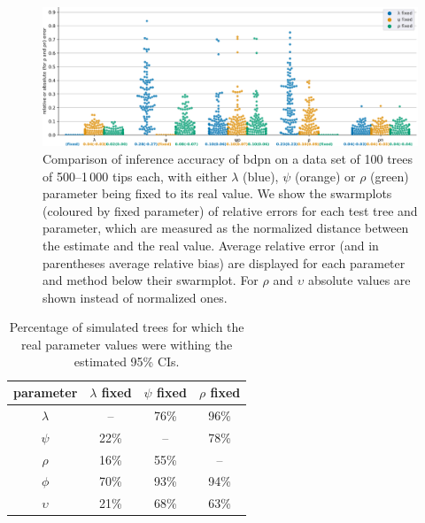 \documentclass[a4paper,10pt]{article}
\begin{document}
\begin{figure}[!pht]
\centering 
\includegraphics[width=1\textwidth]{Fig_errors.eps}
\caption{Comparison of inference accuracy of bdpn on a data set of 100 trees of 500--1\,000 tips each, with either $\lambda$ (blue), $\psi$ (orange) or $\rho$ (green) parameter being fixed to its real value.
We show the swarmplots (coloured by fixed parameter) of relative errors for each test tree and parameter, which are measured as the normalized distance between the estimate and the real value. Average relative error (and in parentheses average relative bias) are displayed for each parameter and method below their swarmplot. For $\rho$ and $\upsilon$ absolute values are shown instead of normalized ones. } 
\label{fig:sim} 
\end{figure}
 
 \begin{table}[!h]\centering
\small
\caption{Percentage of simulated trees for which the real parameter values were withing the estimated 95\% CIs. \smallskip}
\begin{tabular}{c|ccc}
\textbf{parameter} & \textbf{$\lambda$ fixed} & \textbf{$\psi$ fixed} & \textbf{$\rho$ fixed} \\
\toprule 
 $\lambda$ & -- &  76\% & 96\% \\
 $\psi$ & 22\% & -- & 78\% \\
 $\rho$ & 16\% & 55\%  & -- \\
 $\phi$ & 70\% & 93\% & 94\% \\
 $\upsilon$ & 21\% & 68\% & 63\% \\
\bottomrule
\end{tabular}
\label{tbl:ci}
\end{table}
\end{document}

